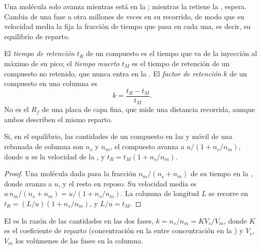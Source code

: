 Una molécula solo avanza mientras está en la ; mientras la retiene la ,
espera. Cambia de una fase a otra millones de veces en su recorrido, de modo que su velocidad media la fija
la fracción de tiempo que pasa en cada una, es decir, su equilibrio de reparto.

\begin{definition}[Retención]\label{def:b2:chromatography:retention}
El \emph{tiempo de retención} $t_R$ de un compuesto es el tiempo que va de la inyección al
máximo de su pico; el \emph{tiempo muerto} $t_M$ es el tiempo de retención de un
compuesto no retenido, que nunca entra en la . El \emph{factor de retención}
$k$ de un compuesto en una columna es
\begin{equation*}
k = \frac{t_R - t_M}{t_M}.
\end{equation*}
No es el $R_f$ de una placa de capa fina, que mide una distancia recorrida, aunque ambos describen
el mismo reparto.
\end{definition}

\begin{proposition}\label{prop:b2:chromatography:retention-time}
Si, en el equilibrio, las cantidades de un compuesto en las  y móvil de una rebanada de columna
son $n_s$ y $n_m$, el compuesto avanza a $u/(1 + n_s/n_m)$, donde $u$ es la velocidad de la ,
y $t_R = t_M(1 + n_s/n_m)$.
\end{proposition}

\begin{proof}
Una molécula dada pasa la fracción $n_m/(n_s + n_m)$ de su tiempo en la , donde avanza a
$u$, y el resto en reposo. Su velocidad media es $u\,n_m/(n_s + n_m) = u/(1 + n_s/n_m)$. La columna de
longitud $L$ se recorre en $t_R = (L/u)(1 + n_s/n_m)$, y $L/u = t_M$.
\end{proof}

\begin{proposition}\label{prop:b2:chromatography:k-and-K}
El  es la razón de las cantidades en las dos fases, $k = n_s/n_m = KV_s/V_m$, donde $K$
es el coeficiente de reparto (concentración en la  entre concentración en la ) y $V_s$, $V_m$ los volúmenes de las fases en la columna.
\end{proposition}

